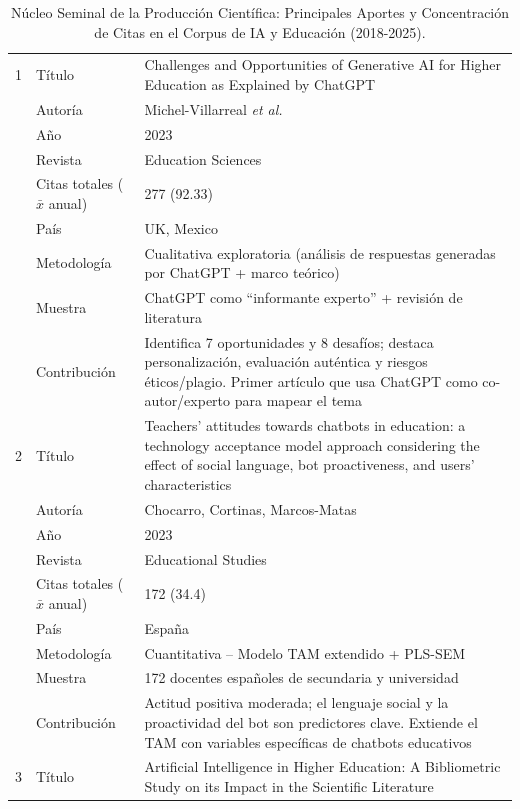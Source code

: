 \documentclass[spanish]{textolivre}
\begin{document}
\newpage
{
\footnotesize

\begin{longtable}{@{}p{0.2cm}p{3cm}p{10cm}@{}}
\caption{Núcleo Seminal de la Producción Científica: Principales Aportes y Concentración de Citas en el Corpus de IA y Educación (2018-2025).}\label{tab-1}\\
\toprule
1 & Título  & Challenges and Opportunities of Generative AI for Higher Education as Explained by ChatGPT\\
  & Autoría & Michel-Villarreal \textit{et al.} \\
  & Año     & 2023 \\
  & Revista & Education Sciences \\
  & Citas totales ($\bar{x}$ anual) & 277 (92.33) \\
  & País & UK, Mexico \\
  & Metodología & Cualitativa exploratoria (análisis de respuestas generadas por ChatGPT + marco teórico) \\
  & Muestra & ChatGPT como ``informante experto'' + revisión de literatura \\
  & Contribución & Identifica 7 oportunidades y 8 desafíos; destaca personalización, evaluación auténtica y riesgos éticos/plagio. Primer artículo que usa ChatGPT como co-autor/experto para mapear el tema \\
\midrule
2 & Título  & Teachers' attitudes towards chatbots in education: a technology acceptance model approach considering the effect of social language, bot proactiveness, and users' characteristics \\
  & Autoría & Chocarro, Cortinas, Marcos-Matas \\
  & Año     & 2023 \\
  & Revista & Educational Studies \\
  & Citas totales ($\bar{x}$ anual) & 172 (34.4)  \\
  & País & España \\
  & Metodología & Cuantitativa -- Modelo TAM extendido + PLS-SEM \\
  & Muestra & 172 docentes españoles de secundaria y universidad \\
  & Contribución & Actitud positiva moderada; el lenguaje social y la proactividad del bot son predictores clave. Extiende el TAM con variables específicas de chatbots educativos \\
\midrule
3 & Título  &  Artificial Intelligence in Higher Education: A Bibliometric Study on its Impact in the Scientific Literature  \\

\end{longtable}}
\end{document}
